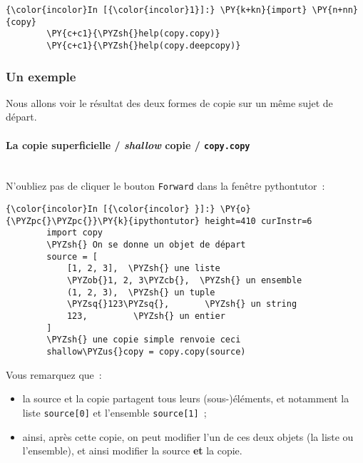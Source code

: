    \begin{Verbatim}[commandchars=\\\{\}]
{\color{incolor}In [{\color{incolor}1}]:} \PY{k+kn}{import} \PY{n+nn}{copy}
        \PY{c+c1}{\PYZsh{}help(copy.copy)}
        \PY{c+c1}{\PYZsh{}help(copy.deepcopy)}
\end{Verbatim}


    \hypertarget{un-exemple}{%
\subsubsection{Un exemple}\label{un-exemple}}

    Nous allons voir le résultat des deux formes de copie sur un même sujet
de départ.

    \hypertarget{la-copie-superficielle-shallow-copie-copy.copy}{%
\paragraph{\texorpdfstring{La copie superficielle / \emph{shallow} copie
/
\texttt{copy.copy}}{La copie superficielle / shallow copie / copy.copy}\\\\}\label{la-copie-superficielle-shallow-copie-copy.copy}}

    N'oubliez pas de cliquer le bouton \texttt{Forward} dans la fenêtre
pythontutor~:

    \begin{Verbatim}[commandchars=\\\{\}]
{\color{incolor}In [{\color{incolor} }]:} \PY{o}{\PYZpc{}\PYZpc{}}\PY{k}{ipythontutor} height=410 curInstr=6
        import copy
        \PYZsh{} On se donne un objet de départ
        source = [
            [1, 2, 3],  \PYZsh{} une liste
            \PYZob{}1, 2, 3\PYZcb{},  \PYZsh{} un ensemble
            (1, 2, 3),  \PYZsh{} un tuple
            \PYZsq{}123\PYZsq{},       \PYZsh{} un string
            123,         \PYZsh{} un entier
        ]
        \PYZsh{} une copie simple renvoie ceci
        shallow\PYZus{}copy = copy.copy(source)
\end{Verbatim}


    Vous remarquez que~:
    
\begin{itemize}
	\item 
	la source et la copie partagent tous leurs
	(sous-)éléments, et notamment la liste \texttt{source{[}0{]}} et
	l'ensemble \texttt{source{[}1{]}}~;
	\item
	ainsi, après cette copie, on peut
	modifier l'un de ces deux objets (la liste ou l'ensemble), et ainsi
	modifier la source \textbf{et} la copie.
\end{itemize}

